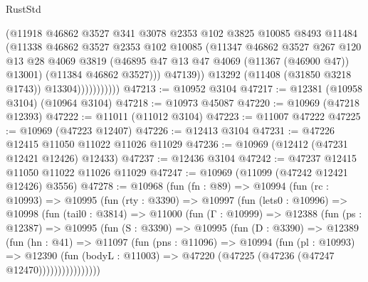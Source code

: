\begin{lexlean}{RustStd}
\begin{coremodule}
                            (@11918
                              @46862
                              @3527
                              @341
                              @3078
                              @2353
                              @102
                              @3825
                              @10085
                              @8493
                              @11484
                              (@11338
                                @46862
                                @3527
                                @2353
                                @102
                                @10085
                                (@11347
                                  @46862
                                  @3527
                                  @267
                                  @120
                                  @13
                                  @28
                                  @4069
                                  @3819
                                  (@46895 @47 @13 @47 @4069 (@11367 (@46900 @47)) @13001)
                                  (@11384 @46862 @3527)))
                              @47139))
                          @13292
                          (@11408 (@31850 @3218 @1743))
                          @13304)))))))))))
@47213 := @10952 @3104
@47217 := @12381 (@10958 @3104) (@10964 @3104)
@47218 := @10973 @45087
@47220 := @10969 (@47218 @12393)
@47222 := @11011 (@11012 @3104)
@47223 := @11007 @47222
@47225 := @10969 (@47223 @12407)
@47226 := @12413 @3104
@47231 := @47226 @12415 @11050 @11022 @11026 @11029
@47236 := @10969 (@12412 (@47231 @12421 @12426) @12433)
@47237 := @12436 @3104
@47242 := @47237 @12415 @11050 @11022 @11026 @11029
@47247 := @10969 (@11099 (@47242 @12421 @12426) @3556)
@47278 := @10968
    (fun (fn : @89) =>
    @10994
      (fun (rc : @10993) =>
      @10995
        (fun (rty : @3390) =>
        @10997
          (fun (lets0 : @10996) =>
          @10998
            (fun (tail0 : @3814) =>
            @11000
              (fun (Γ : @10999) =>
              @12388
                (fun (ps : @12387) =>
                @10995
                  (fun (S : @3390) =>
                  @10995
                    (fun (D : @3390) =>
                    @12389
                      (fun (hn : @41) =>
                      @11097
                        (fun (pns : @11096) =>
                        @10994
                          (fun (pl : @10993) =>
                          @12390
                            (fun (bodyL : @11003) =>
                            @47220 (@47225 (@47236 (@47247 @12470))))))))))))))))

\end{coremodule}
\end{lexlean}
